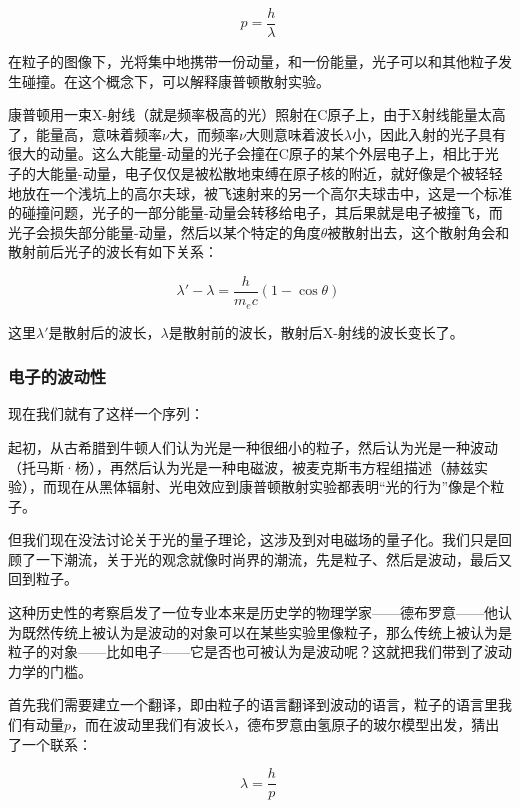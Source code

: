\begin{equation}
p = \frac{h }{\lambda }~
\end{equation}

在粒子的图像下，光将集中地携带一份动量，和一份能量，光子可以和其他粒子发生碰撞。在这个概念下，可以解释康普顿散射实验。

康普顿用一束X-射线（就是频率极高的光）照射在C原子上，由于X射线能量太高了，能量高，意味着频率$\nu$大，而频率$\nu$大则意味着波长$\lambda$小，因此入射的光子具有很大的动量。这么大能量-动量的光子会撞在C原子的某个外层电子上，相比于光子的大能量-动量，电子仅仅是被松散地束缚在原子核的附近，就好像是个被轻轻地放在一个浅坑上的高尔夫球，被飞速射来的另一个高尔夫球击中，这是一个标准的碰撞问题，光子的一部分能量-动量会转移给电子，其后果就是电子被撞飞，而光子会损失部分能量-动量，然后以某个特定的角度$\theta$被散射出去，这个散射角会和散射前后光子的波长有如下关系：

\begin{equation}
\lambda'  - \lambda  = \frac{h }{m_e c}  (1 - \cos \theta)~
\end{equation}

这里$\lambda'$是散射后的波长，$\lambda$是散射前的波长，散射后X-射线的波长变长了。

\subsubsection{电子的波动性}

现在我们就有了这样一个序列：

起初，从古希腊到牛顿人们认为光是一种很细小的粒子，然后认为光是一种波动（托马斯·杨），再然后认为光是一种电磁波，被麦克斯韦方程组描述（赫兹实验），而现在从黑体辐射、光电效应到康普顿散射实验都表明“光的行为”像是个粒子。

但我们现在没法讨论关于光的量子理论，这涉及到对电磁场的量子化。我们只是回顾了一下潮流，关于光的观念就像时尚界的潮流，先是粒子、然后是波动，最后又回到粒子。

这种历史性的考察启发了一位专业本来是历史学的物理学家——德布罗意——他认为既然传统上被认为是波动的对象可以在某些实验里像粒子，那么传统上被认为是粒子的对象——比如电子——它是否也可被认为是波动呢？这就把我们带到了波动力学的门槛。

首先我们需要建立一个翻译，即由粒子的语言翻译到波动的语言，粒子的语言里我们有动量$p$，而在波动里我们有波长$\lambda$，德布罗意由氢原子的玻尔模型出发，猜出了一个联系：

\begin{equation}
\lambda = \frac{h }{p }~
\end{equation}

